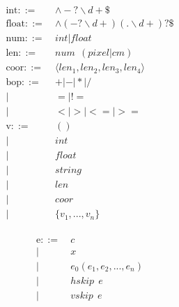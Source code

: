 \begin{figure}[!ht]
\small
\begin{minipage}{0.4\columnwidth}
\begin{align*}
\text{int} ::=~& \land-?\backslash d+\$\\
\text{float} ::=~& \land(-?\backslash d+)(.\backslash d+)?\$\\
\text{num} ::=~& int|float\\
\text{len} ::=~& num ~~ (pixel|cm)\\
\text{coor} ::=~& \langle len_1, len_2, len_3, len_4\rangle\\
\text{bop} ::= 
~& +|-|*|/\\
|~&=|!=\\
|~&<|>|<=|>=\\
\text{v} ::=~& 
() \\
|~& int \\
|~& float \\
|~& string \\
|~& len \\
|~& coor \\
|~& \{v_1, ..., v_n\} \\
\end{align*}
\end{minipage}
\begin{minipage}{0.4\columnwidth}
\begin{align*}
\text{e} ::= 
~& c \tag{constant}\label{syntax:constant}\\
|~& x \tag{name}\label{syntax:name}\\
|~& e_0(e_1, e_2, ..., e_n) \tag{constraints} \label{syntax:constraints}\\
|~& hskip ~~e \tag{horizontal skip}\label{syntax:hskip}\\
|~& vskip ~~e \tag{vertical skip}\label{syntax:vskip}\\

\end{align*}
\end{minipage}
\end{figure}
